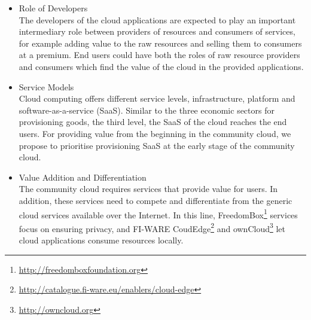 \begin{itemize}
\item Role of Developers
\\
The developers of the cloud applications are expected to play an important intermediary role between providers of resources and consumers of services, for example adding value to the raw resources and selling them to consumers at a premium. 
End users could have both the roles of raw resource providers and consumers which find the value of the cloud in the provided applications.


\item Service Models
\\
Cloud computing offers different service levels, infrastructure, platform and software-as-a-service (SaaS). %
Similar to the three economic sectors for provisioning goods, the third level, the SaaS of the cloud reaches the end users. 
For providing value from the beginning in the community cloud, we propose to prioritise provisioning SaaS at the early stage of the community cloud. %


\item Value Addition and Differentiation
\\
The community cloud requires services that provide value for users. 
In addition, these services need to compete and differentiate from the generic cloud services available over the Internet.
In this line, FreedomBox\footnote{\url{http://freedomboxfoundation.org}} services focus on ensuring privacy, and FI-WARE CoudEdge\footnote{\url{http://catalogue.fi-ware.eu/enablers/cloud-edge}} and ownCloud\footnote{\url{http://owncloud.org}} let cloud applications consume resources locally.

\end{itemize}


